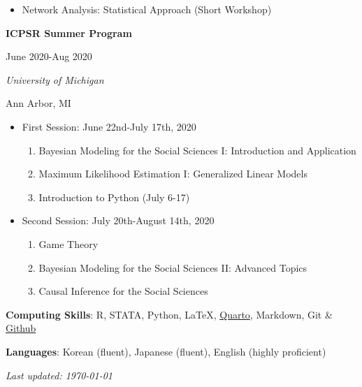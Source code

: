 \documentclass[
  16,
]{article}
\providecommand{\tightlist}{%
  \setlength{\itemsep}{0pt}\setlength{\parskip}{0pt}}\usepackage{longtable,booktabs,array}
\begin{document}
\begin{itemize}
\tightlist
\item
  Network Analysis: Statistical Approach (Short Workshop)
\end{itemize}

\vspace{7pt}

  \begin{multicols}{2}
    \begin{flushleft}{\bf ICPSR Summer Program}\end{flushleft}
    \begin{flushright}June 2020-Aug 2020\end{flushright}
  \end{multicols}
    \begin{multicols}{2}
    \begin{flushleft}{\it University of Michigan}\end{flushleft}
    \begin{flushright}Ann Arbor, MI\end{flushright}
  \end{multicols}
  \vspace{-0.17cm}

\begin{itemize}
\item
  First Session: June 22nd-July 17th, 2020

  \begin{enumerate}
  \def\labelenumi{\arabic{enumi}.}
  \tightlist
  \item
    Bayesian Modeling for the Social Sciences I: Introduction and
    Application
  \item
    Maximum Likelihood Estimation I: Generalized Linear Models
  \item
    Introduction to Python (July 6-17)
  \end{enumerate}
\item
  Second Session: July 20th-August 14th, 2020

  \begin{enumerate}
  \def\labelenumi{\arabic{enumi}.}
  \tightlist
  \item
    Game Theory
  \item
    Bayesian Modeling for the Social Sciences II: Advanced Topics
  \item
    Causal Inference for the Social Sciences
  \end{enumerate}
\end{itemize}

\vspace{7pt}

\textbf{Computing Skills}: R, STATA, Python, \LaTeX,
\href{https://quarto.org/}{Quarto}, Markdown, Git \&
\href{www.github.com}{Github}

\vspace{7pt}

\textbf{Languages}: Korean (fluent), Japanese (fluent), English (highly
proficient)

\mbox{} \vfill \centering \textit{Last updated: \today}
\end{document}
